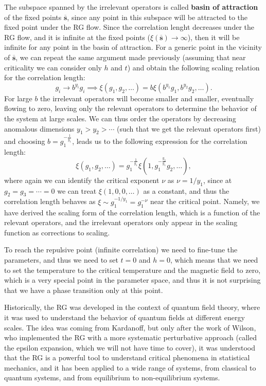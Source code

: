 The subspace spanned by the irrelevant operators is called \textbf{basin of attraction} of the fixed points \(\overline{\mathbf{s}}\), since any point in this subspace will be attracted to the fixed point under the RG flow. Since the correlation lenght decreases under the RG flow, and it is infinite at the fixed points (\(\xi(\overline{\mathbf{s}}) \to \infty\)), then it will be infinite for any point in the basin of attraction. For a generic point in the vicinity of \(\overline{\mathbf{s}}\), we can repeat the same argument made previously (assuming that near criticality we can consider only \(h\) and \(t\)) and obtain the following scaling relation for the correlation length:
\[
    g_i \to b^{y_i} g_i \implies \xi(g_1, g_2, \dots) = b \xi(b^{y_1} g_1, b^{y_2} g_2, \dots).
\]
For large \(b\) the irrelevant operators will become smaller and smaller, eventually flowing to zero, leaving only the relevant operators to determine the behavior of the system at large scales. We can thus order the operators by decreasing anomalous dimensions \(y_1 > y_2 > \cdots\) (such that we get the relevant operators first) and choosing \(b = g_1^{-\frac{1}{y_1}}\), leads us to the following expression for the correlation length:
\[
    \xi(g_1, g_2, \dots) = g_1^{-\frac{1}{y_1}} \xi(1, g_1^{-\frac{y_2}{y_1}} g_2, \dots),
\]
where again we can identify the critical exponent \(\nu\) as \(\nu = 1 / y_1\), since at \(g_2 = g_3 = \cdots = 0\) we can treat \(\xi(1,0,0,\dots)\) as a constant, and thus the correlation length behaves as \(\xi \sim g_1^{-1/y_1} = g_1^{-\nu}\) near the critical point. Namely, we have derived the scaling form of the correlation length, which is a function of the relevant operators, and the irrelevant operators only appear in the scaling function as corrections to scaling.

To reach the repulsive point (infinite correlation) we need to fine-tune the parameters, and thus we need to set \(t = 0\) and \(h = 0\), which means that we need to set the temperature to the critical temperature and the magnetic field to zero, which is a very special point in the parameter space, and thus it is not surprising that we have a phase transition only at this point.

Historically, the RG was developed in the context of quantum field theory, where it was used to understand the behavior of quantum fields at different energy scales. The idea was coming from Kardanoff, but only after the work of Wilson, who implemented the RG with a more systematic perturbative approach (called the epsilon expansion, which we will not have time to cover), it was understood that the RG is a powerful tool to understand critical phenomena in statistical mechanics, and it has been applied to a wide range of systems, from classical to quantum systems, and from equilibrium to non-equilibrium systems.